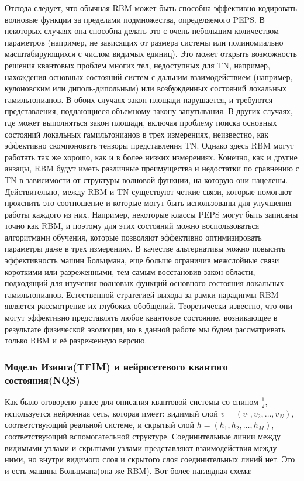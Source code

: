 Отсюда следует, что обычная RBM может быть способна эффективно кодировать волновые функции за пределами подмножества, определяемого PEPS. В некоторых случаях она способна делать это с очень небольшим количеством параметров (например, не зависящих от размера системы или полиномиально масштабирующихся с числом видимых единиц). Это может открыть возможность решения квантовых проблем многих тел, недоступных для TN, например, нахождения основных состояний систем с дальним взаимодействием (например, кулоновским или диполь-дипольным) или возбужденных состояний локальных гамильтонианов. В обоих случаях закон площади нарушается, и требуются представления, поддающиеся объемному закону запутывания. В других случаях, где может выполняться закон площади, включая проблему поиска основных состояний локальных гамильтонианов в трех измерениях, неизвестно, как эффективно скомпоновать тензоры представления TN. Однако здесь RBM могут работать так же хорошо, как и в более низких измерениях. 
Конечно, как и другие анзацы, RBM будут иметь различные преимущества и недостатки по сравнению с TN в зависимости от структуры волновой функции, на которую они нацелены. Действительно, между RBM и TN существуют четкие связи, которые помогают прояснить это соотношение и которые могут быть использованы для улучшения работы каждого из них. Например, некоторые классы PEPS могут быть записаны точно как RBM, и поэтому для этих состояний можно воспользоваться алгоритмами обучения, которые позволяют эффективно оптимизировать параметры даже в трех измерениях. 
В качестве альтернативы можно повысить эффективность машин Больцмана, еще больше ограничив межслойные связи короткими или разреженными, тем самым восстановив закон области, подходящий для изучения волновых функций основного состояния локальных гамильтонианов.
Естественной стратегией выхода за рамки парадигмы RBM является рассмотрение их глубоких обобщений. Теоретически известно, что они могут эффективно представлять любое квантовое состояние, возникающее в результате физической эволюции, но в данной работе мы будем рассматривать только RBM и её разреженную версию.
\vspace{0,25cm}

\subsubsection{Модель Изинга(TFIM) и нейросетевого квантого состояния(NQS)}


Как было оговорено ранее для описания квантовой системы со спином \(\frac{1}{2}\), используется нейронная сеть, которая имеет: видимый слой \(v = (v_1, v_2, \ldots, v_N)\), соответствующий реальной системе, и скрытый слой \(h = (h_1, h_2, \ldots, h_M)\), соответствующий вспомогательной структуре. Соединительные линии между видимыми узлами и скрытыми узлами представляют взаимодействия между ними, но внутри видимого слоя и скрытого слоя соединительных линий нет. Это и есть машина Больцмана(она же RBM). 
Вот более наглядная схема:



